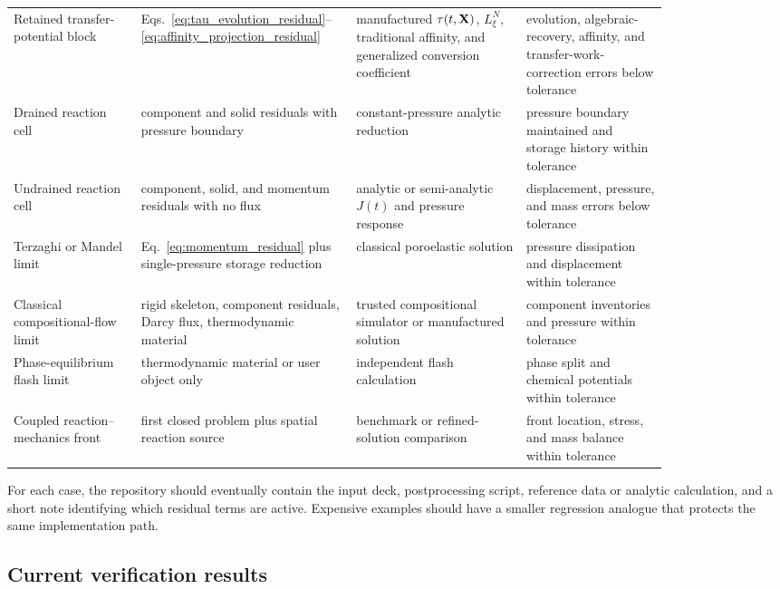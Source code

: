 \begin{table}[ht]
\begin{tabular}{p{0.18\linewidth}p{0.22\linewidth}p{0.24\linewidth}p{0.20\linewidth}}
		Retained transfer-potential block & Eqs.~\eqref{eq:tau_evolution_residual}--\eqref{eq:affinity_projection_residual} & manufactured \(\tau(t,\mathbf{X})\), \(L_\xi^N\), traditional affinity, and generalized conversion coefficient & evolution, algebraic-recovery, affinity, and transfer-work-correction errors below tolerance \\
		Drained reaction cell & component and solid residuals with pressure boundary & constant-pressure analytic reduction & pressure boundary maintained and storage history within tolerance \\
		Undrained reaction cell & component, solid, and momentum residuals with no flux & analytic or semi-analytic \(J(t)\) and pressure response & displacement, pressure, and mass errors below tolerance \\
		Terzaghi or Mandel limit & Eq.~\eqref{eq:momentum_residual} plus single-pressure storage reduction & classical poroelastic solution & pressure dissipation and displacement within tolerance \\
		Classical compositional-flow limit & rigid skeleton, component residuals, Darcy flux, thermodynamic material & trusted compositional simulator or manufactured solution & component inventories and pressure within tolerance \\
		Phase-equilibrium flash limit & thermodynamic material or user object only & independent flash calculation & phase split and chemical potentials within tolerance \\
		Coupled reaction--mechanics front & first closed problem plus spatial reaction source & benchmark or refined-solution comparison & front location, stress, and mass balance within tolerance \\
		\bottomrule
	\end{tabular}
\end{table}

\FloatBarrier

For each case, the repository should eventually contain the input deck,
postprocessing script, reference data or analytic calculation, and a short note
identifying which residual terms are active.  Expensive examples should have a
smaller regression analogue that protects the same implementation path.

\subsection{Current verification results}
\label{sec:current_verification_results}

